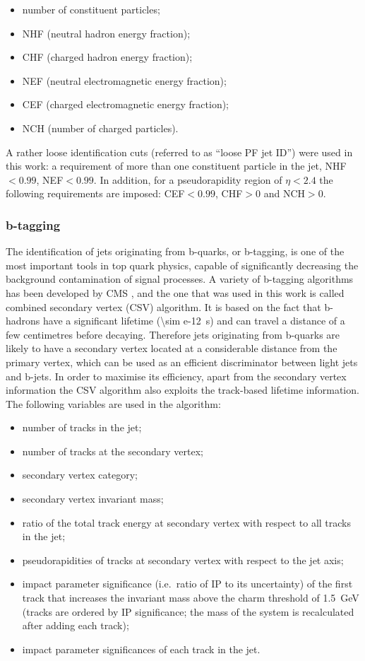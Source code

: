 \begin{itemize}
  \item number of constituent particles;
  \item NHF (neutral hadron energy fraction);
  \item CHF (charged hadron energy fraction);
  \item NEF (neutral electromagnetic energy fraction);
  \item CEF (charged electromagnetic energy fraction);
  \item NCH (number of charged particles).
\end{itemize}

A rather loose identification cuts (referred to as ``loose PF jet ID'') were used in this work: a requirement of more
than one constituent particle in the jet, NHF$<0.99$, NEF$<0.99$. In addition, for a pseudorapidity region of
$\eta<2.4$ the following requirements are imposed: CEF$<0.99$, CHF$>0$ and NCH$>0$.

\subsubsection{b-tagging}
\label{sss:b-tagging}
The identification of jets originating from b-quarks, or b-tagging, is one of the  most important tools in top quark
physics, capable of significantly decreasing the background contamination of signal processes. A variety of b-tagging
algorithms has been developed by CMS \autocite{b-tagging_CMS}, and the one that was used in this work is called
combined secondary vertex (CSV) algorithm. It is based on the fact that b-hadrons have a significant lifetime (\SI{\sim
e-12}{s}) and can travel a distance of a few centimetres before decaying. Therefore jets originating from b-quarks are
likely to have a secondary vertex located at a considerable distance from the primary vertex, which can be used as an
efficient discriminator between light jets and b-jets. In order to maximise its efficiency, apart from the secondary
vertex information the CSV algorithm also exploits the track-based lifetime information. The following variables are
used in the algorithm:
\begin{itemize}
 \item number of tracks in the jet;
 \item number of tracks at the secondary vertex;
 \item secondary vertex category;
 \item secondary vertex invariant mass;
 \item ratio of the total track energy at secondary vertex with respect to all tracks in the jet;
 \item pseudorapidities of tracks at secondary vertex with respect to the jet axis;
 \item impact parameter significance (i.e.\ ratio of IP to its uncertainty) of the first track that increases the
 invariant mass above the charm threshold of \SI{1.5}{\GeV} (tracks are ordered by IP significance; the mass of the
 system is recalculated after adding each track);
 \item impact parameter significances of each track in the jet.
\end{itemize}

